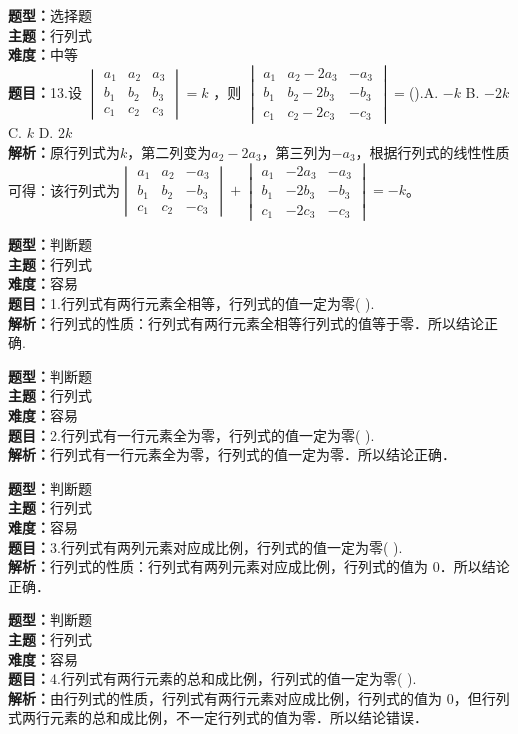 \documentclass{ctexart}
\newenvironment{question}[5]{%
	\noindent\textbf{题型：}#1\\
	\textbf{主题：}#2\\
	\textbf{难度：}#3\\
	\textbf{题目：}#4\\
	\textbf{解析：}#5\\
	\vspace{1em}
}{}
\begin{document}
	\begin{question}
		{选择题}
		{行列式}
		{中等}
		{13.设 $\begin{vmatrix}a_1 & a_2 & a_3 \\ b_1 & b_2 & b_3 \\ c_1 & c_2 & c_3\end{vmatrix}=k$ ，则 $\begin{vmatrix}a_1 & a_2-2a_3 & -a_3 \\ b_1 & b_2-2b_3 & -b_3 \\ c_1 & c_2-2c_3 & -c_3\end{vmatrix}=$().A. $-k$ B. $-2k$ C. $k$ D. $2k$}
		{原行列式为$k$，第二列变为$a_2 - 2a_3$，第三列为$-a_3$，根据行列式的线性性质可得：该行列式为$\begin{vmatrix}a_1 & a_2 & -a_3 \\ b_1 & b_2 & -b_3 \\ c_1 & c_2 & -c_3\end{vmatrix} + \begin{vmatrix}a_1 & -2a_3 & -a_3 \\ b_1 & -2b_3 & -b_3 \\ c_1 & -2c_3 & -c_3\end{vmatrix} = -k$。}
	\end{question}
	
	\begin{question}
		{判断题}
		{行列式}
		{容易}
		{1.行列式有两行元素全相等，行列式的值一定为零(  ).}
		{行列式的性质：行列式有两行元素全相等行列式的值等于零．所以结论正确.}
	\end{question}
	
	
	\begin{question}
		{判断题}
		{行列式}
		{容易}
		{2.行列式有一行元素全为零，行列式的值一定为零(  ).}
		{行列式有一行元素全为零，行列式的值一定为零．所以结论正确．}
	\end{question}
	
	\begin{question}
		{判断题}
		{行列式}
		{容易}
		{3.行列式有两列元素对应成比例，行列式的值一定为零(  ).}
		{行列式的性质：行列式有两列元素对应成比例，行列式的值为 0．所以结论正确．}
	\end{question}
	
	\begin{question}
		{判断题}
		{行列式}
		{容易}
		{4.行列式有两行元素的总和成比例，行列式的值一定为零(  ).}
		{由行列式的性质，行列式有两行元素对应成比例，行列式的值为 0，但行列式两行元素的总和成比例，不一定行列式的值为零．所以结论错误．}
	\end{question}
	
\end{document}
